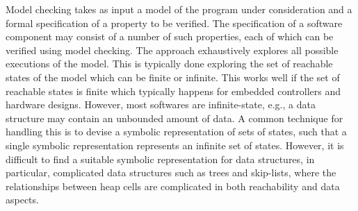 Model checking takes as input a model of the program under
consideration and a formal specification of a property to be verified. The specification of a software component may consist of a number of such properties, each of which can be verified using model checking. The approach exhaustively explores all possible executions of the model. This is typically done exploring the set of reachable states of the model  which can be finite or infinite. 
This works well if the set of reachable states is finite which typically happens for embedded controllers and hardware designs. However, most softwares are infinite-state, e.g., a data structure may contain an unbounded amount of data. A common technique for handling this is to devise a symbolic representation of sets of states, such that a single symbolic representation represents an infinite set of states. 
However, it is difficult to find a suitable symbolic representation for data structures, in particular, complicated data structures such as trees and skip-lists, where the relationships between heap cells are complicated in both reachability and data aspects.


